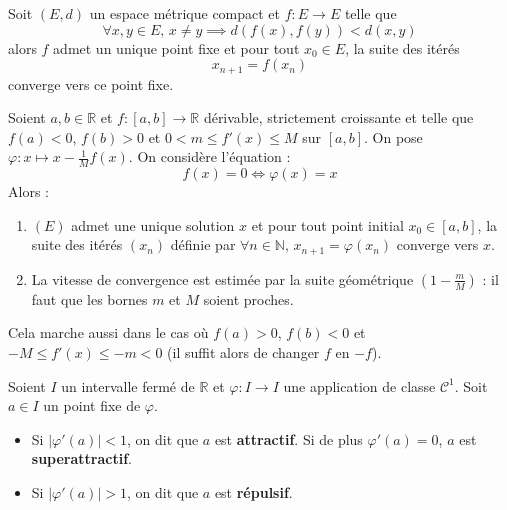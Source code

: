 	\begin{theorem}
		Soit $(E,d)$ un espace métrique compact et $f : E \rightarrow E$ telle que
		\[ \forall x, y \in E, \, x \neq y \implies d(f(x), f(y)) < d(x,y) \]
		alors $f$ admet un unique point fixe et pour tout $x_0 \in E$, la suite des itérés
		\[ x_{n+1} = f(x_n) \]
		converge vers ce point fixe.
	\end{theorem}
	
	
	\begin{application}
		Soient $a, b \in \mathbb{R}$ et $f : [a, b] \rightarrow \mathbb{R}$ dérivable, strictement croissante et telle que $f(a) < 0$, $f(b) > 0$ et $0 < m \leq f'(x) \leq M$ sur $[a, b]$. On pose $\varphi : x \mapsto x - \frac{1}{M} f(x)$. On considère l'équation :
		\[ f(x) = 0 \iff \varphi(x) = x \tag{$E$} \]
		Alors :
		\begin{enumerate}[label=(\roman*)]
			\item $(E)$ admet une unique solution $x$ et pour tout point initial $x_0 \in [a, b]$, la suite des itérés $(x_n)$ définie par $\forall n \in \mathbb{N}, \, x_{n+1} = \varphi(x_n)$ converge vers $x$.
			\item La vitesse de convergence est estimée par la suite géométrique $\left( 1 - \frac{m}{M} \right)$ : il faut que les bornes $m$ et $M$ soient proches.
		\end{enumerate}
	\end{application}
	
	\begin{remark}
		Cela marche aussi dans le cas où $f(a) > 0$, $f(b) < 0$ et $-M \leq f'(x) \leq -m < 0$ (il suffit alors de changer $f$ en $-f$).
	\end{remark}
	
	\begin{definition}
		Soient $I$ un intervalle fermé de $\mathbb{R}$ et $\varphi : I \rightarrow I$ une application de classe $\mathcal{C}^1$. Soit $a \in I$ un point fixe de $\varphi$.
		\begin{itemize}
			\item Si $|\varphi'(a)| < 1$, on dit que $a$ est \textbf{attractif}. Si de plus $\varphi'(a) = 0$, $a$ est \textbf{superattractif}.
			\item Si $|\varphi'(a)| > 1$, on dit que $a$ est \textbf{répulsif}.
		\end{itemize}
	\end{definition}
	
